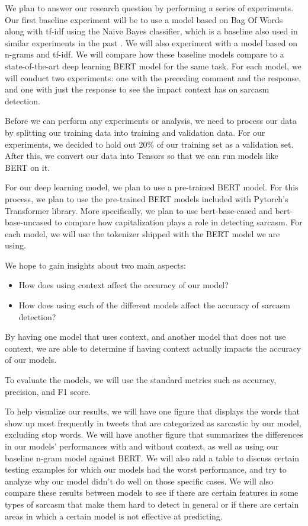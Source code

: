 \documentclass[11pt,a4paper]{article}
\begin{document}
We plan to answer our research question by performing a series of experiments. Our first baseline experiment will be to use a model based on Bag Of Words along with tf-idf \cite{Salton:86} using the Naive Bayes classifier, which is a baseline also used in similar experiments in the past \cite{hazarika}. We will also experiment with a model based on n-grams and tf-idf. We will compare how these baseline models compare to a state-of-the-art deep learning BERT model \cite{devlin2019bert} for the same task. For each model, we will conduct two experiments: one with the preceding comment and the response, and one with just the response to see the impact context has on sarcasm detection.

Before we can perform any experiments or analysis, we need to process our data by splitting our training data into training and validation data. For our experiments, we decided to hold out 20\% of our training set as a validation set. After this, we convert our data into Tensors so that we can run models like BERT on it.

For our deep learning model, we plan to use a pre-trained BERT model. For this process, we plan to use the pre-trained BERT models included with Pytorch's Transformer library. More specifically, we plan to use bert-base-cased and bert-base-uncased to compare how capitalization plays a role in detecting sarcasm. For each model, we will use the tokenizer shipped with the BERT model we are using. 


We hope to gain insights about two main aspects: 
\begin{itemize}
  \item How does using context affect the accuracy of our model?
  \item How does using each of the different models affect the accuracy of sarcasm detection?
\end{itemize}
By having one model that uses context, and another model that does not use context, we are able to determine if having context actually impacts the accuracy of our models.

To evaluate the models, we will use the standard metrics such as accuracy, precision, and F1 score. 

To help visualize our results, we will have one figure that displays the words that show up most frequently in tweets that are categorized as sarcastic by our model, excluding stop words.
We will have another figure that summarizes the differences in our models' performances with and without context, as well as using our baseline n-gram model against BERT.
We will also add a table to discuss certain testing examples for which our models had the worst performance, and try to analyze why our model didn't do well on those specific cases. We will also compare these results between models to see if there are certain features in some types of sarcasm that make them hard to detect in general or if there are certain areas in which a certain model is not effective at predicting.




\end{document}

